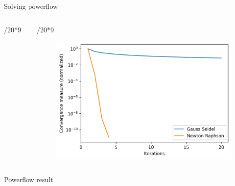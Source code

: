\documentclass[final]{beamer}
\newlength{\colwidth}
\begin{document}
\begin{frame}[t]
\begin{columns}[t]
\begin{column}{\colwidth}
\begin{block}{Solving powerflow}
\begin{columns}[t]
      \begin{column}{\colwidth/20*9}
  
        \begin{figure}
          \centering
          
        \end{figure}
  
      \end{column}
  
      \begin{column}{\colwidth/20*9}
  
        \begin{figure}
          \centering
          \includegraphics[width=18cm]{./img/graphs/convergance.png}
        \end{figure}
  
      \end{column}
  
    \end{columns}

 \end{block}

 \begin{block}{Powerflow result}


\end{block}
\end{column}
\end{columns}
\end{frame}
\end{document}
